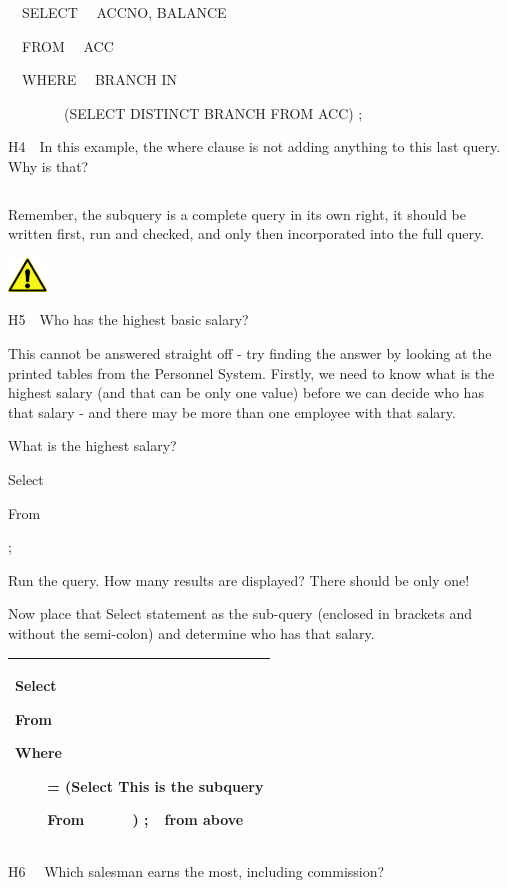 \ \ SELECT \ \ ACCNO, BALANCE

\ \ FROM \ \ ACC

\ \ WHERE \ \ BRANCH IN 

\ \ \ \ \ \ \ \ (SELECT DISTINCT BRANCH FROM ACC) ;

H4\ \ In this example, the where clause is not adding anything to this last query. Why is that?

\begin{flushleft}
\tablefirsthead{}
\tablehead{}
\tabletail{}
\tablelasttail{}
\begin{supertabular}{|m{14.583cm}|}
\hline
\\\hline
\end{supertabular}
\end{flushleft}
Remember, the subquery is a complete query in its own right, it should be written first, run and checked, and only then incorporated into the full query.

\begin{center}
  
\includegraphics[width=1.048cm,height=0.903cm]{images/img (2).png}

\end{center}
H5\ \ Who has the highest basic salary?

This cannot be answered straight off - try finding the answer by looking at the printed tables from the Personnel System.  Firstly, we need to know what is the highest salary (and that can be only one value) before we can decide who has that salary - and there may be more than one employee with that salary.

What is the highest salary?

Select

From\ \ \ \ \ \ \ \ \ \ \ \ \ \   

;

Run the query.  How many results are displayed?  There should be only one!

Now place that Select statement as the sub-query (enclosed in brackets and without the semi-colon) and determine who has that salary.

\begin{flushleft}
\tablefirsthead{}
\tablehead{}
\tabletail{}
\tablelasttail{}
\begin{supertabular}{|m{14.551001cm}|}
\hline
Select

From

Where

\ \ \ \ = (Select  This is the subquery

\ \ \ \   From\ \ \ \ \ \   ) ;\ \   from above

\\\hline
\end{supertabular}
\end{flushleft}
H6 \ \ Which salesman earns the most, including commission?

